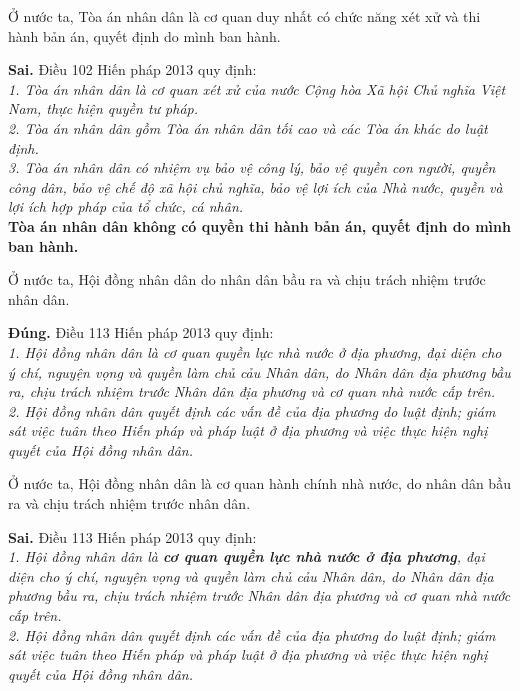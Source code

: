 \begin{ques}
Ở nước ta, Tòa án nhân dân là cơ quan duy nhất có chức năng xét xử và thi hành bản án, quyết định do mình ban hành.
\end{ques}
\begin{ans}
\textbf{Sai.} Điều 102 Hiến pháp 2013 quy định:\\
\textit{1. Tòa án nhân dân là cơ quan xét xử của nước Cộng hòa Xã hội Chủ nghĩa Việt Nam, thực hiện quyền tư pháp.} \\
\textit{2. Tòa án nhân dân gồm Tòa án nhân dân tối cao và các Tòa án khác do luật định.}\\
\textit{3. Tòa án nhân dân có nhiệm vụ bảo vệ công lý, bảo vệ quyền con người, quyền công dân, bảo vệ chế độ xã hội chủ nghĩa, bảo vệ lợi ích của Nhà nước, quyền và lợi ích hợp pháp của tổ chức, cá nhân.}\\
\textbf{Tòa án nhân dân không có quyền thi hành bản án, quyết định do mình ban hành.}
\end{ans}

\begin{ques}
Ở nước ta, Hội đồng nhân dân do nhân dân bầu ra và chịu trách nhiệm trước nhân dân.
\end{ques}
\begin{ans}
\textbf{Đúng.} Điều 113 Hiến pháp 2013 quy định: \\
\textit{1. Hội đồng nhân dân là cơ quan quyền lực nhà nước ở địa phương, đại diện cho ý chí, nguyện vọng và quyền làm chủ cảu Nhân dân, do Nhân dân địa phương bầu ra, chịu trách nhiệm trước Nhân dân địa phương và cơ quan nhà nước cấp trên.}\\
\textit{2. Hội đồng nhân dân quyết định các vấn đề của địa phương do luật định; giám sát việc tuân theo Hiến pháp và pháp luật ở địa phương và việc thực hiện nghị quyết của Hội đồng nhân dân.}
\end{ans}

\begin{ques}
Ở nước ta, Hội đồng nhân dân là cơ quan hành chính nhà nước, do nhân dân bầu ra và chịu trách nhiệm trước nhân dân.
\end{ques}
\begin{ans}
\textbf{Sai.} Điều 113 Hiến pháp 2013 quy định: \\
\textit{1. Hội đồng nhân dân là \textbf{cơ quan quyền lực nhà nước ở địa phương}, đại diện cho ý chí, nguyện vọng và quyền làm chủ cảu Nhân dân, do Nhân dân địa phương bầu ra, chịu trách nhiệm trước Nhân dân địa phương và cơ quan nhà nước cấp trên.}\\
\textit{2. Hội đồng nhân dân quyết định các vấn đề của địa phương do luật định; giám sát việc tuân theo Hiến pháp và pháp luật ở địa phương và việc thực hiện nghị quyết của Hội đồng nhân dân.}
\end{ans}

